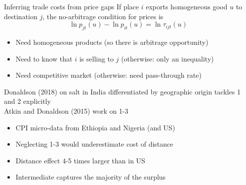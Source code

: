 \documentclass[10pt,notes=hide,aspectratio=169]{beamer}
\begin{document}
\begin{frame}{Inferring trade costs from price gaps}
If place $i$ exports homogeneous good $u$ to destination $j$, 
the no-arbitrage condition for prices is
$$\ln p_{jt}(u) -\ln p_{it}(u) = \ln \tau_{ijt}(u)$$
\vspace{-6mm}
\begin{itemize}
	\item Need homogeneous products (so there is arbitrage opportunity)
	\item Need to know that $i$ is selling to $j$ (otherwise: only an inequality)
	\item Need competitive market (otherwise: need pass-through rate)
\end{itemize}
Donaldson (2018) on salt in India differentiated by geographic origin tackles 1 and 2 explicitly\\
Atkin and Donaldson (2015) work on 1-3
\begin{itemize}
	\item CPI micro-data from Ethiopia and Nigeria (and US)
	\item Neglecting 1-3 would underestimate cost of distance
	\item Distance effect 4-5 times larger than in US
	\item Intermediate captures the majority of the surplus
\end{itemize}
\end{frame}
\end{document}
